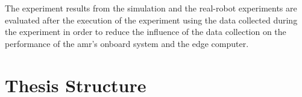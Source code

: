 The experiment results from the simulation and the real-robot experiments are evaluated after the execution of the experiment using the data collected during the experiment in order to reduce the influence of the data collection on the performance of the \gls{amr}'s onboard system and the edge computer.

\section{Thesis Structure}\label{sec:introduction:thesis_structure}

